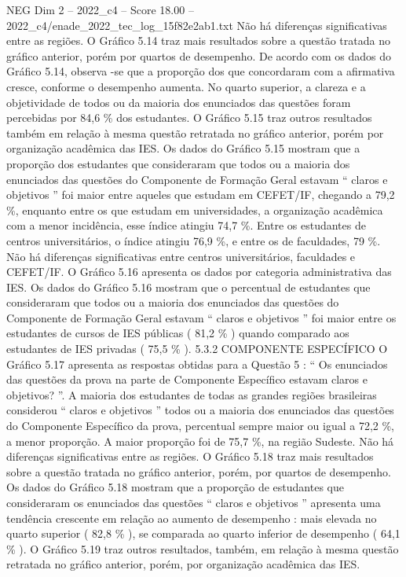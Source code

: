 \begin{textsample}{NEG Dim 2 – 2022\_c4 – Score 18.00 – 2022\_c4/enade\_2022\_tec\_log\_15f82e2ab1.txt}
Não há diferenças significativas entre as regiões.
O Gráfico 5.14 traz mais resultados sobre a questão tratada no gráfico anterior, porém por quartos de desempenho.
De acordo com os dados do Gráfico 5.14, observa -se que a proporção dos que concordaram com a afirmativa cresce, conforme o desempenho aumenta.
No quarto superior, a clareza e a objetividade de todos ou da maioria dos enunciados das questões foram percebidas por 84,6 \% dos estudantes.
O Gráfico 5.15 traz outros resultados também em relação à mesma questão retratada no gráfico anterior, porém por organização acadêmica das IES.
Os dados do Gráfico 5.15 mostram que a proporção dos estudantes que consideraram que todos ou a maioria dos enunciados das questões do Componente de Formação Geral estavam “ claros e objetivos ” foi maior entre aqueles que estudam em CEFET/IF, chegando a 79,2 \%, enquanto entre os que estudam em universidades, a organização acadêmica com a menor incidência, esse índice atingiu 74,7 \%.
Entre os estudantes de centros universitários, o índice atingiu 76,9 \%, e entre os de faculdades, 79 \%.
Não há diferenças significativas entre centros universitários, faculdades e CEFET/IF.
O Gráfico 5.16 apresenta os dados por categoria administrativa das IES.
Os dados do Gráfico 5.16 mostram que o percentual de estudantes que consideraram que todos ou a maioria dos enunciados das questões do Componente de Formação Geral estavam “ claros e objetivos ” foi maior entre os estudantes de cursos de IES públicas ( 81,2 \% ) quando comparado aos estudantes de IES privadas ( 75,5 \% ). 5.3.2 COMPONENTE ESPECÍFICO O Gráfico 5.17 apresenta as respostas obtidas para a Questão 5 : “ Os enunciados das questões da prova na parte de Componente Específico estavam claros e objetivos? ”.
A maioria dos estudantes de todas as grandes regiões brasileiras considerou “ claros e objetivos ” todos ou a maioria dos enunciados das questões do Componente Específico da prova, percentual sempre maior ou igual a 72,2 \%, a menor proporção.
A maior proporção foi de 75,7 \%, na região Sudeste.
Não há diferenças significativas entre as regiões.
O Gráfico 5.18 traz mais resultados sobre a questão tratada no gráfico anterior, porém, por quartos de desempenho.
Os dados do Gráfico 5.18 mostram que a proporção de estudantes que consideraram os enunciados das questões “ claros e objetivos ” apresenta uma tendência crescente em relação ao aumento de desempenho : mais elevada no quarto superior ( 82,8 \% ), se comparada ao quarto inferior de desempenho ( 64,1 \% ).
O Gráfico 5.19 traz outros resultados, também, em relação à mesma questão retratada no gráfico anterior, porém, por organização acadêmica das IES.

\end{textsample}
